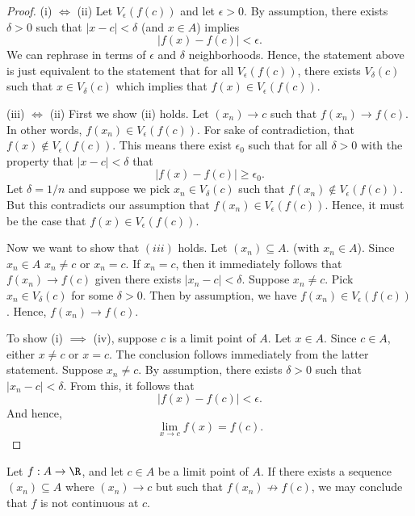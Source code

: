 \begin{proof}
    (i) \( \iff \) (ii) Let \( V_{\epsilon}(f(c)) \) and let \( \epsilon > 0  \). By assumption, there exists \( \delta > 0  \) such that \( | x - c  | < \delta \) (and \( x \in A  \)) implies 
    \[ | f(x) - f(c) | < \epsilon. \]
    We can rephrase in terms of \( \epsilon  \) and \( \delta \) neighborhoods. Hence, the statement above is just equivalent to the statement that for all \( V_{\epsilon }(f(c)) \), there exists \( V_{\delta}(c) \) such that \( x \in V_{\delta}(c) \) which implies that \( f(x) \in V_{\epsilon }(f(c)) \). 

     (iii) \( \iff \) (ii)  First we show (ii) holds. Let \( (x_n) \to c  \) such that \( f(x_n) \to f(c)  \). In other words, \( f(x_n) \in V_{\epsilon }(f(c)) \). For sake of contradiction, that \( f(x) \notin V_{\epsilon }(f(c)) \). This means there exist \( \epsilon_0  \) such that for all \( \delta > 0  \) with the property that \( | x - c  | < \delta \) that 
    \[  | f(x) - f(c)  | \geq \epsilon_0. \] Let \( \delta = 1 / n  \) and suppose we pick \( x_n \in V_{\delta}(c) \) such that \( f(x_n) \notin V_{\epsilon }(f(c)) \). But this contradicts our assumption that \( f(x_n) \in V_{\epsilon }(f(c)) \). Hence, it must be the case that \( f(x) \in V_{\epsilon }(f(c)) \).

    Now we want to show that \( (iii) \) holds. Let \( (x_n) \subseteq A  \).
    (with \( x_n \in A  \)). Since \( x_n \in A  \) \( x_n \neq c  \) or \( x_n = c  \). If \( x_n = c  \), then it immediately follows that \( f(x_n) \to f(c) \) given there exists \( | x_n  - c | < \delta \). Suppose \( x_n \neq c  \). Pick \( x_n \in V_{\delta}(c) \) for some \( \delta > 0  \). Then by assumption, we have \( f(x_n) \in V_{\epsilon }(f(c)) \). Hence, \( f(x_n) \to f(c) \).

    To show (i) \( \implies \) (iv), suppose \( c  \) is a limit point of \( A  \). Let \( x \in A  \). Since \( c \in A \), either \( x \neq c  \) or \( x = c  \). The conclusion follows immediately from the latter statement. Suppose \( x_n \neq c  \). By assumption, there exists \( \delta > 0  \) such that \( | x_n -c  | < \delta \). From this, it follows that 
    \[  |  f(x) - f(c)  | < \epsilon. \]
    And hence, 
    \[ \lim_{ x \to c } f(x) = f(c). \]
\end{proof}

\begin{tcolorbox}
    \begin{cor}
    Let \( f: A \to \R  \), and let \( c \in A  \) be a limit point of \( A  \). If there exists a sequence \( (x_n) \subseteq A  \) where \( (x_n) \to c  \) but such that \( f(x_n) \not \to f(c) \), we may conclude that \( f \) is not continuous at \( c \).
    \end{cor}
\end{tcolorbox}

